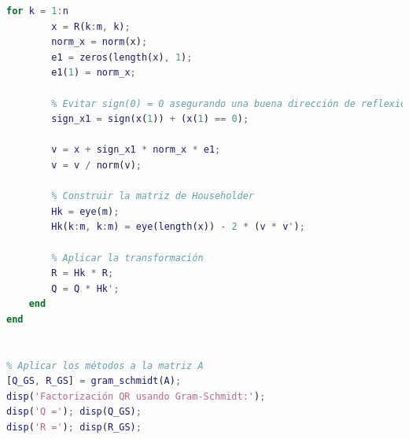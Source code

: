 \begin{homeworkProblem}
\begin{itemize}
\begin{solucion}
\begin{lstlisting}[language = matlab]
    for k = 1:n
        x = R(k:m, k);
        norm_x = norm(x);
        e1 = zeros(length(x), 1); 
        e1(1) = norm_x;
        
        % Evitar sign(0) = 0 asegurando una buena dirección de reflexión
        sign_x1 = sign(x(1)) + (x(1) == 0);
        
        v = x + sign_x1 * norm_x * e1;
        v = v / norm(v);
        
        % Construir la matriz de Householder
        Hk = eye(m);
        Hk(k:m, k:m) = eye(length(x)) - 2 * (v * v');
        
        % Aplicar la transformación
        R = Hk * R;
        Q = Q * Hk';
    end
end


% Aplicar los métodos a la matriz A
[Q_GS, R_GS] = gram_schmidt(A);
disp('Factorización QR usando Gram-Schmidt:');
disp('Q ='); disp(Q_GS);
disp('R ='); disp(R_GS);


\end{lstlisting}
\end{solucion}
\end{itemize}
\end{homeworkProblem}

